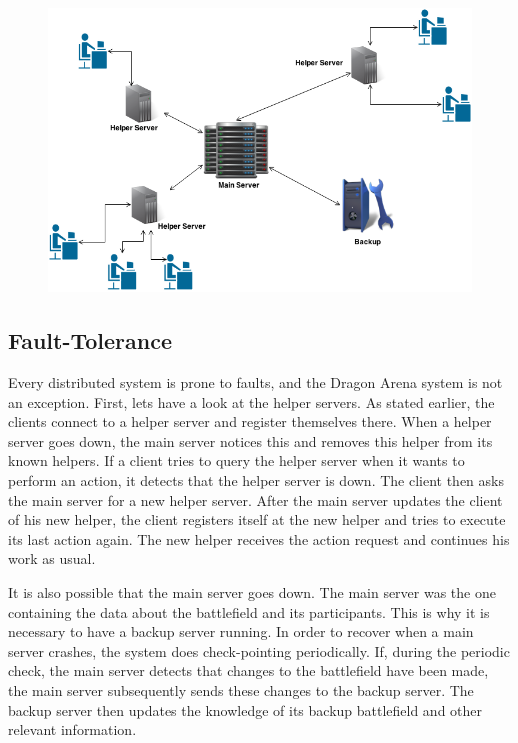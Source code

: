 \begin{figure}[ht]
\includegraphics[scale=0.5]{images/DCS.png}
\end{figure}

\subsection{Fault-Tolerance}
Every distributed system is prone to faults, and the Dragon Arena system is not an exception. 
First, lets have a look at the helper servers. As stated earlier, the clients connect to a helper server and register themselves there.
When a helper server goes down, the main server notices this and removes this helper from its known helpers.
If a client tries to query the helper server when it wants to perform an action, it detects that the helper server is down.
The client then asks the main server for a new helper server.
After the main server updates the client of his new helper, the client registers itself at the new helper and tries to execute its last action again.
The new helper receives the action request and continues his work as usual.

It is also possible that the main server goes down. 
The main server was the one containing the data about the battlefield and its participants.
This is why it is necessary to have a backup server running.  
In order to recover when a main server crashes, the system does check-pointing periodically.
If, during the periodic check, the main server detects that changes to the battlefield have been made, the main server subsequently sends these changes to the backup server.
The backup server then updates the knowledge of its backup battlefield and other relevant information.

